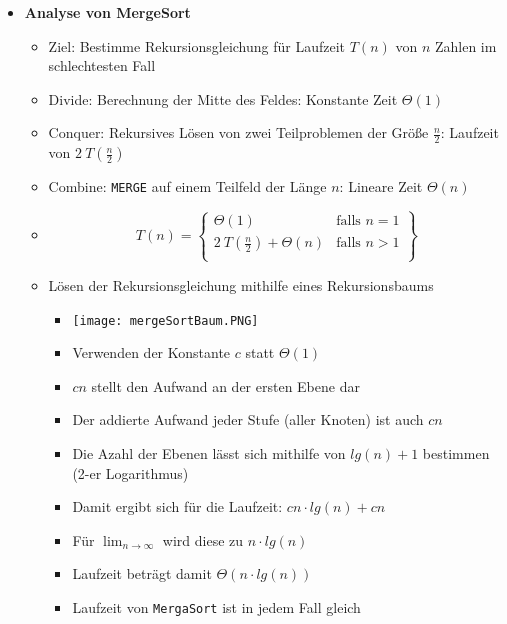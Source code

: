 \begin{itemize}
        \item \textbf{Analyse von MergeSort} 
            \begin{itemize}
                \item Ziel: Bestimme Rekursionsgleichung für Laufzeit $T(n)$ von $n$ Zahlen im schlechtesten Fall
                \item Divide: Berechnung der Mitte des Feldes: Konstante Zeit $\Theta(1)$
                \item Conquer: Rekursives Lösen von zwei Teilproblemen der Größe $\frac{n}{2}$: Laufzeit von $2~T(\frac{n}{2})$
                \item Combine: \texttt{MERGE} auf einem Teilfeld der Länge $n$: Lineare Zeit $\Theta(n)$
                \item[] \[
                        T(n) = \left.
                            \begin{cases}
                                \Theta(1) & \text{falls } n = 1 \\
                                2~T(\frac{n}{2}) + \Theta(n) & \text{falls } n > 1 \\
                            \end{cases}
                            \right \}
                        \]
                \item Lösen der Rekursionsgleichung mithilfe eines Rekursionsbaums
                    \begin{itemize}
                        \item[] \texttt{[image: mergeSortBaum.PNG]}
                        \item Verwenden der Konstante $c$ statt $\Theta(1)$
                        \item $cn$ stellt den Aufwand an der ersten Ebene dar 
                        \item Der addierte Aufwand jeder Stufe (aller Knoten) ist auch $cn$
                        \item Die Azahl der Ebenen lässt sich mithilfe von $lg(n) + 1$ bestimmen (2-er Logarithmus)
                        \item Damit ergibt sich für die Laufzeit: $cn \cdot lg(n)+cn$
                        \item Für $\lim_{n \rightarrow \infty}$ wird diese zu $n \cdot lg(n)$
                        \item Laufzeit beträgt damit $\Theta(n \cdot lg(n))$
                        \item Laufzeit von \texttt{MergaSort} ist in jedem Fall gleich
                    \end{itemize}
                
            \end{itemize}
    \end{itemize}

